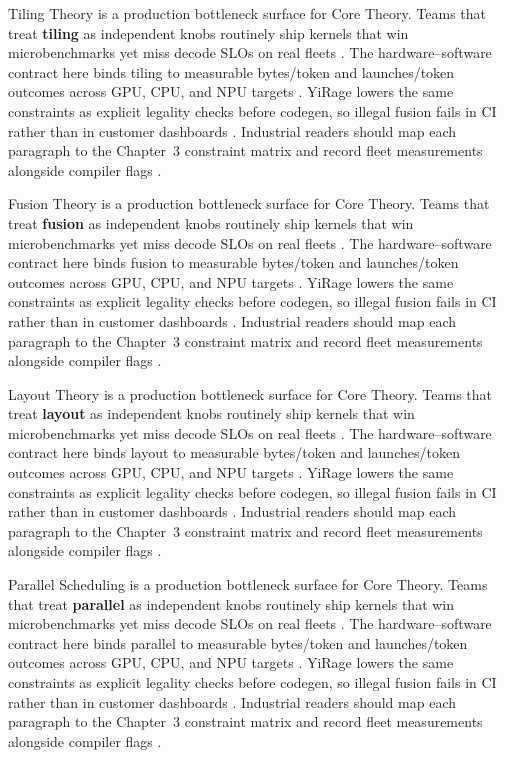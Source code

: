 Tiling Theory is a production bottleneck surface for Core Theory. Teams that treat \textbf{tiling} as independent knobs routinely ship kernels that win microbenchmarks yet miss decode SLOs on real fleets \citep{nvidia2024cudagraphs,taxbreak2026}. The hardware--software contract here binds tiling to measurable bytes/token and launches/token outcomes across GPU, CPU, and NPU targets \citep{liu2024deepseekv3,memoryfloor2026}. YiRage lowers the same constraints as explicit legality checks before codegen, so illegal fusion fails in CI rather than in customer dashboards \citep{patel2025llminference,nvidia2022hopper}. Industrial readers should map each paragraph to the Chapter~3 constraint matrix and record fleet measurements alongside compiler flags \citep{taxbreak2026,semianalysis2024tma}.

Fusion Theory is a production bottleneck surface for Core Theory. Teams that treat \textbf{fusion} as independent knobs routinely ship kernels that win microbenchmarks yet miss decode SLOs on real fleets \citep{liu2024deepseekv3,memoryfloor2026}. The hardware--software contract here binds fusion to measurable bytes/token and launches/token outcomes across GPU, CPU, and NPU targets \citep{patel2025llminference,nvidia2022hopper}. YiRage lowers the same constraints as explicit legality checks before codegen, so illegal fusion fails in CI rather than in customer dashboards \citep{taxbreak2026,semianalysis2024tma}. Industrial readers should map each paragraph to the Chapter~3 constraint matrix and record fleet measurements alongside compiler flags \citep{memoryfloor2026,amd2024xdna}.

Layout Theory is a production bottleneck surface for Core Theory. Teams that treat \textbf{layout} as independent knobs routinely ship kernels that win microbenchmarks yet miss decode SLOs on real fleets \citep{patel2025llminference,nvidia2022hopper}. The hardware--software contract here binds layout to measurable bytes/token and launches/token outcomes across GPU, CPU, and NPU targets \citep{taxbreak2026,semianalysis2024tma}. YiRage lowers the same constraints as explicit legality checks before codegen, so illegal fusion fails in CI rather than in customer dashboards \citep{memoryfloor2026,amd2024xdna}. Industrial readers should map each paragraph to the Chapter~3 constraint matrix and record fleet measurements alongside compiler flags \citep{nvidia2022hopper,amd2024aie}.

Parallel Scheduling is a production bottleneck surface for Core Theory. Teams that treat \textbf{parallel} as independent knobs routinely ship kernels that win microbenchmarks yet miss decode SLOs on real fleets \citep{taxbreak2026,semianalysis2024tma}. The hardware--software contract here binds parallel to measurable bytes/token and launches/token outcomes across GPU, CPU, and NPU targets \citep{memoryfloor2026,amd2024xdna}. YiRage lowers the same constraints as explicit legality checks before codegen, so illegal fusion fails in CI rather than in customer dashboards \citep{nvidia2022hopper,amd2024aie}. Industrial readers should map each paragraph to the Chapter~3 constraint matrix and record fleet measurements alongside compiler flags \citep{semianalysis2024tma,dlbook}.


